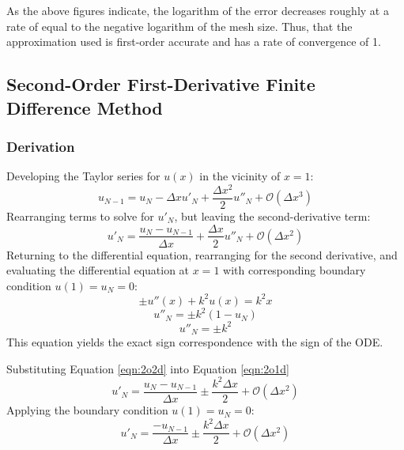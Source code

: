 \documentclass[10pt, reqno]{article}		%
\numberwithin{equation}{section}
\begin{document}
As the above figures indicate, the logarithm of the error decreases roughly at a rate of equal to the negative logarithm of the mesh size. Thus, that the approximation used is first-order accurate and has a rate of convergence of 1.

\subsection{Second-Order First-Derivative Finite Difference Method}

\subsubsection{Derivation}

Developing the Taylor series for $u(x)$ in the vicinity of $x = 1$:
\begin{equation}
u_{N-1} = u_N - \Delta x u'_N + \frac{\Delta x^2}{2} u''_N + \mathcal{O}(\Delta x^3)
\end{equation}
Rearranging terms to solve for $u'_N$, but leaving the second-derivative term:
\begin{equation}
\label{eqn:2o1d}
u'_N = \frac{u_N - u_{N-1}}{\Delta x} + \frac{\Delta x}{2} u''_N + \mathcal{O}(\Delta x^2)
\end{equation}
Returning to the differential equation, rearranging for the second derivative, and evaluating the differential equation at $x = 1$ with corresponding boundary condition $u(1) = u_N = 0$:
\begin{equation}
\pm u''(x)+k^2u(x)=k^2x
\end{equation}
\begin{equation}
u''_N = \pm k^2(1-u_N)
\end{equation}
\begin{equation}
\label{eqn:2o2d}
u''_N = \pm k^2
\end{equation}
This equation yields the exact sign correspondence with the sign of the ODE.

Substituting Equation \ref{eqn:2o2d} into Equation \ref{eqn:2o1d}
\begin{equation}
u'_N = \frac{u_N - u_{N-1}}{\Delta x} \pm \frac{k^2 \Delta x}{2} + \mathcal{O}(\Delta x^2)
\end{equation}
Applying the boundary condition $u(1) = u_N = 0$:
\begin{equation}
u'_N = \frac{-u_{N-1}}{\Delta x} \pm \frac{k^2 \Delta x}{2} + \mathcal{O}(\Delta x^2)
\end{equation}
\end{document}
